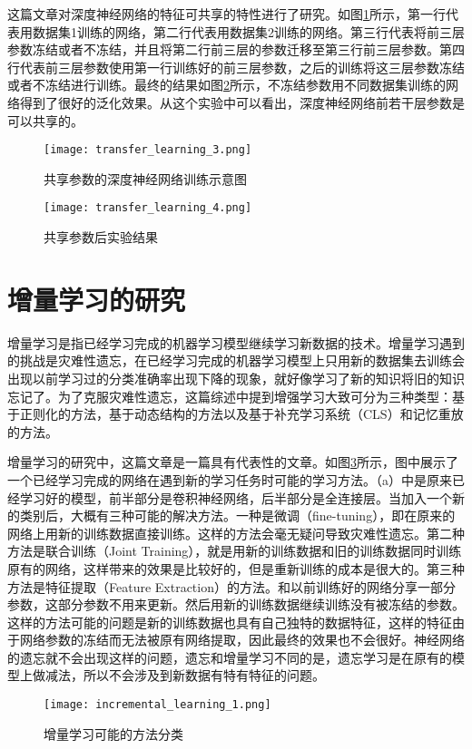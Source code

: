 这篇文章\cite{yosinski_2014_NIPS}对深度神经网络的特征可共享的特性进行了研究。如图\ref{fig:transfer_learning_3}所示，第一行代表用数据集1训练的网络，第二行代表用数据集2训练的网络。第三行代表将前三层参数冻结或者不冻结，并且将第二行前三层的参数迁移至第三行前三层参数。第四行代表前三层参数使用第一行训练好的前三层参数，之后的训练将这三层参数冻结或者不冻结进行训练。最终的结果如图\ref{fig:transfer_learning_4}所示，不冻结参数用不同数据集训练的网络得到了很好的泛化效果。从这个实验中可以看出，深度神经网络前若干层参数是可以共享的。
\begin{figure}
    \centering
    \texttt{[image: transfer\_learning\_3.png]}
    \caption{共享参数的深度神经网络训练示意图}
    \label{fig:transfer_learning_3}
\end{figure}
\begin{figure}
    \centering
    \texttt{[image: transfer\_learning\_4.png]}
    \caption{共享参数后实验结果}
    \label{fig:transfer_learning_4}
\end{figure}

\section{增量学习的研究}
增量学习\cite{PARISI201954}是指已经学习完成的机器学习模型继续学习新数据的技术。增量学习遇到的挑战是灾难性遗忘，在已经学习完成的机器学习模型上只用新的数据集去训练会出现以前学习过的分类准确率出现下降的现象，就好像学习了新的知识将旧的知识忘记了。为了克服灾难性遗忘，这篇综述中提到增强学习大致可分为三种类型：基于正则化的方法，基于动态结构的方法以及基于补充学习系统（CLS）和记忆重放的方法。

增量学习的研究中，这篇文章\cite{8107520}是一篇具有代表性的文章。如图\ref{fig:incremental_learning_1}所示，图中展示了一个已经学习完成的网络在遇到新的学习任务时可能的学习方法。（a）中是原来已经学习好的模型，前半部分是卷积神经网络，后半部分是全连接层。当加入一个新的类别后，大概有三种可能的解决方法。一种是微调（fine-tuning），即在原来的网络上用新的训练数据直接训练。这样的方法会毫无疑问导致灾难性遗忘。第二种方法是联合训练（Joint Training），就是用新的训练数据和旧的训练数据同时训练原有的网络，这样带来的效果是比较好的，但是重新训练的成本是很大的。第三种方法是特征提取（Feature Extraction）的方法。和以前训练好的网络分享一部分参数，这部分参数不用来更新。然后用新的训练数据继续训练没有被冻结的参数。这样的方法可能的问题是新的训练数据也具有自己独特的数据特征，这样的特征由于网络参数的冻结而无法被原有网络提取，因此最终的效果也不会很好。神经网络的遗忘就不会出现这样的问题，遗忘和增量学习不同的是，遗忘学习是在原有的模型上做减法，所以不会涉及到新数据有特有特征的问题。
\begin{figure}
    \centering
    \texttt{[image: incremental\_learning\_1.png]}
    \caption{增量学习可能的方法分类}
    \label{fig:incremental_learning_1}
\end{figure}

